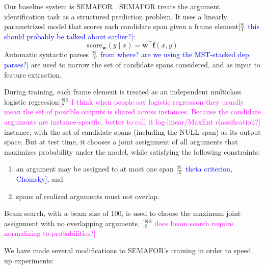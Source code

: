 \documentclass[11pt,a4paper]{article}
\newcommand{\ensuretext}[1]{#1}
\newcommand{\nssmarker}{\ensuretext{\textcolor{magenta}{\ensuremath{^{\textsc{NS}}_{\textsc{S}}}}}}
\newcommand{\stmarker}{\ensuretext{\textcolor{blue}{\ensuremath{^{\textsc{S}}_{\textsc{T}}}}}}
\newcommand{\arkcomment}[3]{\ensuretext{\textcolor{#3}{[#1 #2]}}}
\newcommand{\nss}[1]{\arkcomment{\nssmarker}{#1}{magenta}}
\newcommand{\st}[1]{\arkcomment{\stmarker}{#1}{blue}}
\newcommand{\term}[1]{\textbf{#1}} %
\begin{document}

Our baseline system is SEMAFOR \citep{das-14}.
SEMAFOR treats the argument identification task as a structured prediction problem.
It uses a linearly parametrized model that scores each candidate span given a frame element\st{this should probably be talked about earlier?}:
\begin{equation}
\text{score}_\mathbf{w}(y \mid x) = \mathbf{w}^\top \mathbf{f}(x, y)
\end{equation}
Automatic syntactic parses \st{from where? are we using the MST-stacked dep parses?} are used to narrow the set of candidate spans considered, and as input to feature extraction.

During training, each frame element is treated as an independent multiclass logistic regression\nss{I think when people say logistic regression they usually mean 
the set of possible outputs is shared across instances. Because the candidate arguments are instance-specific, better to call it log-linear/MaxEnt classification?} instance, with the set of candidate spans (including the \textsc{NULL} span) as its output space.
But at test time, it chooses a joint assignment of all arguments that maximizes probability under the model, while satisfying the following constraints:
\begin{enumerate}
  \item an argument may be assigned to at most one span \st{theta criterion, Chomsky}, and
  \item spans of realized arguments must not overlap.
\end{enumerate}
Beam search, with a beam size of 100, is used to choose the maximum joint assignment with no overlapping arguments.
\nss{does beam search require normalizing to probabilities?}

We have made several modifications to SEMAFOR's training in order to speed up experiments:
\end{document}
